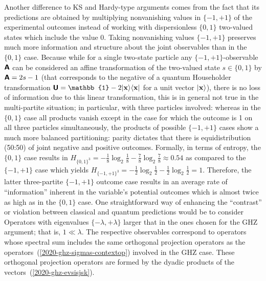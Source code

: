 \documentclass[sn-mathphys]{sn-jnl}%
\theoremstyle{thmstyleone}%
\theoremstyle{thmstyletwo}%
\theoremstyle{thmstylethree}%
\begin{document}
Another difference to KS and Hardy-type arguments comes from the fact that its predictions are obtained by multiplying nonvanishing values in $\{-1,+1\}$
of the experimental outcomes instead of working with dispersionless $\{0,1\}$ two-valued states which include the value $0$.
Taking nonvanishing values $\{-1,+1\}$ preserves much more information and structure about the joint observables than in the $\{0,1\}$ case.
Because while for a single two-state particle
any $\{-1,+1\}$-observable $\textsf{\textbf{A}}$ can be considered an affine transformation
of the two-valued state $s \in \{0,1\}$ by $\textsf{\textbf{A}} = 2 s - 1$
(that corresponds to the negative of a quantum Householder transformation
$\textsf{\textbf{U}}
=
\mathbb{1}- 2  \vert {\bf x} \rangle \langle  {\bf x}  \vert$ for a unit vector $\vert {\bf x} \rangle$),
there is no loss of information due to this linear transformation,
this is in general not true in the multi-partite situation; in particular, with three particles involved:
whereas in the  $\{0,1\}$ case all products vanish except in the case for which the outcome is 1 on all three particles simultaneously,
the products of possible  $\{-1,+1\}$ cases show a much more balanced partitioning:
parity dictates that there is equidistribution (50:50) of joint negative and positive outcomes.
Formally, in terms of entropy, the  $\{0,1\}$  case results in
$H_{\{0,1\}^3} = -\frac{1}{8} \log_2 \frac{1}{8} -  \frac{7}{8} \log_2 \frac{7}{8}   \approx 0.54$
as compared to the  $\{-1,+1\}$ case which yields
$H_{\{-1,+1\}^3} = -\frac{1}{2} \log_2 \frac{1}{2} -  \frac{1}{2} \log_2 \frac{1}{2}  =1$.
Therefore, the latter three-partite $\{-1,+1\}$ outcome case results in an average rate of ``information'' inherent in the variable's potential outcomes
which is almost twice as high as in the  $\{0,1\}$  case.
One straightforward way of enhancing the ``contrast'' or violation between classical and quantum predictions would be to
consider Operators with eigenvalues $\{-\lambda,+\lambda\}$ larger that in the ones chosen for the GHZ argument; that is, $1\ll \lambda $.
The respective observables correspond to operators whose spectral sum includes the same orthogonal projection operators as the operators~(\ref{2020-ghz-sigmas-contextop})
involved in the GHZ case. These orthogonal projection operators are
formed by the dyadic products of the vectors~(\ref{2020-ghz-evsisjsk}).
\end{document}
